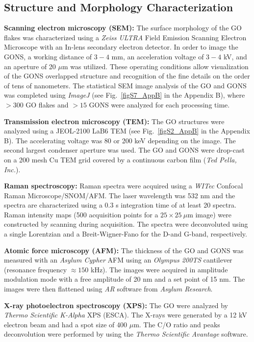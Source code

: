 \subsection{Structure and Morphology Characterization}

\textbf{Scanning electron microscopy (SEM):} The surface morphology of the GO flakes was characterized using a \textit{Zeiss ULTRA} Field Emission Scanning Electron Microscope with an In-lens secondary electron detector. In order to image the GONS, a working distance of $3 - 4$ mm, an acceleration voltage of $3 - 4$ kV, and an aperture of 20 $\mu$m was utilized. These operating conditions allow visualization of the GONS overlapped structure and recognition of the fine details on the order of tens of nanometers. The statistical SEM image analysis of the GO and GONS was completed using \textit{ImageJ} (see Fig.~\ref{figS7_AppB} in the Appendix B), where $> 300$ GO flakes and $> 15$ GONS were analyzed for each processing time.

\textbf{Transmission electron microscopy (TEM):} The GO structures were analyzed using a {JEOL-2100 LaB6 TEM} (see Fig.~\ref{figS2_AppB} in the Appendix B). The accelerating voltage was 80 or 200 keV depending on the image. The second largest condenser aperture was used. The GO and GONS were drop-cast on a 200 mesh Cu TEM grid covered by a continuous carbon film (\textit{Ted Pella, Inc.}).

\textbf{Raman spectroscopy:} Raman spectra were acquired using a \textit{WITec} Confocal Raman Microscope/SNOM/AFM. The laser wavelength was 532 nm and the spectra are characterized using a 0.3 s integration time of at least 20 spectra. Raman intensity maps (500 acquisition points for a $25 \times 25\ \mu$m image) were constructed by scanning during acquisition. The spectra were deconvoluted using a single Lorentzian and a Breit-Wigner-Fano for the D-and G-band, respectively.

\textbf{Atomic force microscopy (AFM):} The thickness of the GO and GONS was measured with an \textit{Asylum Cypher} AFM using an \textit{Olympus 200TS} cantilever (resonance frequency $\approx 150$ kHz). The images were acquired in amplitude modulation mode\cite{Paulo2002} with a free amplitude of 20 nm and a set point of 15 nm. The images were then flattened using \textit{AR} software from \textit{Asylum Research}.

\textbf{X-ray photoelectron spectroscopy (XPS):} The GO were analyzed by \textit{Thermo Scientific K-Alpha} XPS (ESCA). The X-rays were generated by a 12 kV electron beam and had a spot size of 400 $\mu$m. The C/O ratio and peaks deconvolution were performed by using the \textit{Thermo Scientific Avantage} software.


